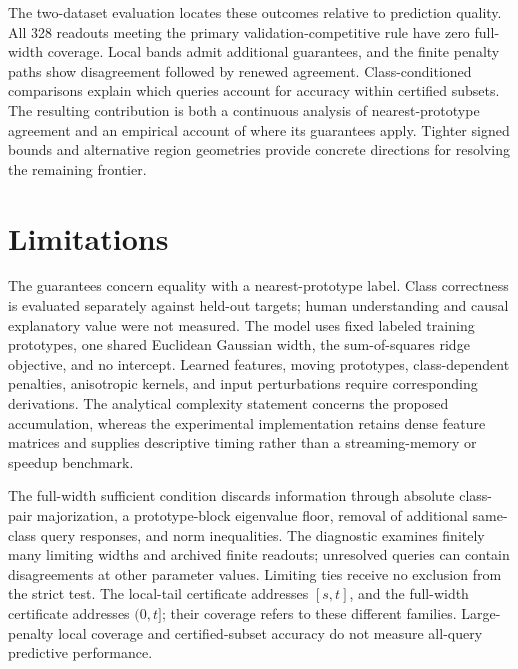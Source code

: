 \documentclass[preprint,12pt,authoryear]{elsarticle}
\begin{document}
The two-dataset evaluation locates these outcomes relative to prediction quality. All 328 readouts meeting the primary validation-competitive rule have zero full-width coverage. Local bands admit additional guarantees, and the finite penalty paths show disagreement followed by renewed agreement. Class-conditioned comparisons explain which queries account for accuracy within certified subsets. The resulting contribution is both a continuous analysis of nearest-prototype agreement and an empirical account of where its guarantees apply. Tighter signed bounds and alternative region geometries provide concrete directions for resolving the remaining frontier.

\section{Limitations}
The guarantees concern equality with a nearest-prototype label. Class correctness is evaluated separately against held-out targets; human understanding and causal explanatory value were not measured. The model uses fixed labeled training prototypes, one shared Euclidean Gaussian width, the sum-of-squares ridge objective, and no intercept. Learned features, moving prototypes, class-dependent penalties, anisotropic kernels, and input perturbations require corresponding derivations. The analytical complexity statement concerns the proposed accumulation, whereas the experimental implementation retains dense feature matrices and supplies descriptive timing rather than a streaming-memory or speedup benchmark.

The full-width sufficient condition discards information through absolute class-pair majorization, a prototype-block eigenvalue floor, removal of additional same-class query responses, and norm inequalities. The diagnostic examines finitely many limiting widths and archived finite readouts; unresolved queries can contain disagreements at other parameter values. Limiting ties receive no exclusion from the strict test. The local-tail certificate addresses $[s,t]$, and the full-width certificate addresses $(0,t]$; their coverage refers to these different families. Large-penalty local coverage and certified-subset accuracy do not measure all-query predictive performance.
\end{document}
